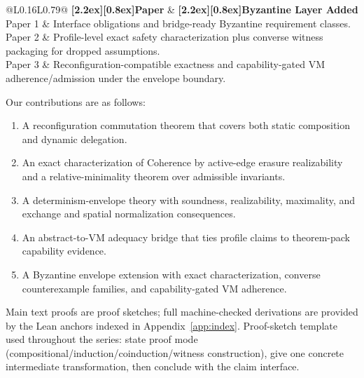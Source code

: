 \documentclass[a4paper,10pt,twocolumn,english]{article}
\numberwithin{equation}{section}
\theoremstyle{paperdef}
\theoremstyle{paperplain}
\theoremstyle{paperdef}
\theoremstyle{paperremark}
\theoremstyle{paperdef}
\newcommand{\thead}[1]{\textbf{\raisebox{0pt}[2.2ex][0.8ex]{#1}}}
\begin{document}
\begin{table}[H]
	\centering
	\scriptsize
	\begin{tabularx}{\columnwidth}{@{}L{0.16\columnwidth}L{0.79\columnwidth}@{}}
		\toprule
		\thead{Paper} & \thead{Byzantine Layer Added}                                                                                 \\
		\midrule
		Paper 1       & Interface obligations and bridge-ready Byzantine requirement classes.                                         \\
		Paper 2       & Profile-level exact safety characterization plus converse witness packaging for dropped assumptions.          \\
		Paper 3       & Reconfiguration-compatible exactness and capability-gated VM adherence/admission under the envelope boundary. \\
		\bottomrule
	\end{tabularx}
	\caption{Cross-paper Byzantine progression.}
	\label{tab:p3-byz-progression}
\end{table}

Our contributions are as follows:
\begin{enumerate}
	\item A reconfiguration commutation theorem that covers both static composition and dynamic delegation.
	\item An exact characterization of Coherence by active-edge erasure realizability and a relative-minimality theorem over admissible invariants.
	\item A determinism-envelope theory with soundness, realizability, maximality, and exchange and spatial normalization consequences.
	\item An abstract-to-VM adequacy bridge that ties profile claims to theorem-pack capability evidence.
	\item A Byzantine envelope extension with exact characterization, converse counterexample families, and capability-gated VM adherence.
\end{enumerate}

Main text proofs are proof sketches; full machine-checked derivations are provided by the Lean anchors indexed in Appendix~\ref{app:index}.
Proof-sketch template used throughout the series: state proof mode
(compositional/induction/coinduction/witness construction), give one concrete
intermediate transformation, then conclude with the claim interface.
\end{document}
